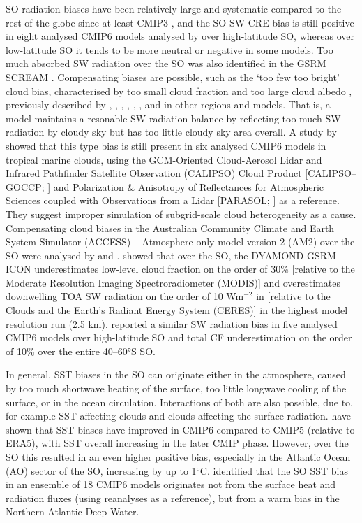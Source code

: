 \documentclass[12pt,a4paper]{article}
\begin{document}
SO radiation biases have been relatively large and systematic compared to the
rest of the globe since at least CMIP3 \citep{trenberth2010}, and the SO SW CRE
bias is still positive in eight analysed CMIP6 models analysed by
\cite{schuddeboom2021} over high-latitude SO, whereas over low-latitude SO it
tends to be more neutral or negative in some models. Too much absorbed SW
radiation over the SO was also identified in the GSRM SCREAM
\cite{caldwell2021}. Compensating biases are possible, such as the `too few too
bright' cloud bias, characterised by too small cloud fraction and too large
cloud albedo \citep{wall2017,kuma2020}, previously described by
\cite{webb2001}, \cite{weare2004}, \cite{zhang2005}, \cite{karlsson2008},
\cite{nam2012}, \cite{klein2013}, and \cite{bender2017} in other regions and
models. That is, a model maintains a resonable SW radiation balance by
reflecting too much SW radiation by cloudy sky but has too little cloudy sky
area overall. A study by \cite{konsta2022} showed that this type bias is still
present in six analysed CMIP6 models in tropical marine clouds, using the
GCM-Oriented Cloud-Aerosol Lidar and Infrared Pathfinder Satellite Observation
(CALIPSO) Cloud Product [CALIPSO--GOCCP; \cite{chepfer2010}] and Polarization
\& Anisotropy of Reflectances for Atmospheric Sciences coupled with
Observations from a Lidar [PARASOL; \citep{lier2008}] as a reference. They
suggest improper simulation of subgrid-scale cloud heterogeneity as a cause.
Compensating cloud biases in the Australian Community Climate and Earth System
Simulator (ACCESS) – Atmosphere-only model version 2 (AM2) over the SO were
analysed by \cite{fiddes2022} and \cite{fiddes2024}.  \cite{possner2022} showed
that over the SO, the DYAMOND GSRM ICON underestimates low-level cloud fraction
on the order of 30\% [relative to the Moderate Resolution Imaging
Spectroradiometer (MODIS)] and overestimates downwelling TOA SW radiation on
the order of 10 Wm$^\mathrm{-2}$ in  [relative to the Clouds and the Earth’s
Radiant Energy System (CERES)] in the highest model resolution run (2.5 km).
\cite{zhao2022} reported a similar SW radiation bias in five analysed CMIP6
models over high-latitude SO and total CF underestimation on the order of 10\%
over the entire 40--60°S SO.

In general, SST biases in the SO can originate either in the atmosphere, caused
by too much shortwave heating of the surface, too little longwave cooling of
the surface, or in the ocean circulation.  Interactions of both are also
possible, due to, for example SST affecting clouds and clouds affecting the
surface radiation.  \cite{zhang2023} have shown that SST biases have improved
in CMIP6 compared to CMIP5 (relative to ERA5), with SST overall increasing in
the later CMIP phase. However, over the SO this resulted in an even higher
positive bias, especially in the Atlantic Ocean (AO) sector of the SO,
increasing by up to 1°C.  \cite{luo2023} identified that the SO SST bias
in an ensemble of 18 CMIP6 models originates not from the surface heat and
radiation fluxes (using reanalyses as a reference), but from a warm bias in the
Northern Atlantic Deep Water.
\end{document}
